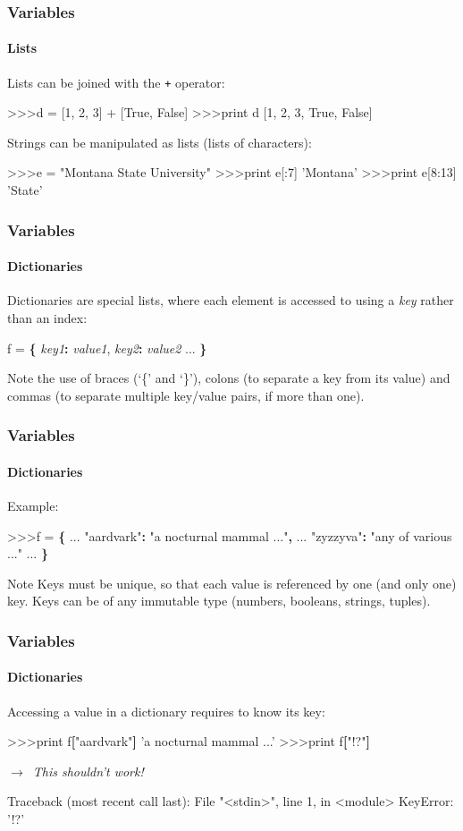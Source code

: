 \documentclass[handout]{beamer}
\def\prompt{>\hspace{-1pt}>\hspace{-1pt}>\/}
\newcommand{\comment}[1]{{\raggedright $\rightarrow$~\textit{\textsf{#1}}}}
\begin{document}
\begin{frame}[fragile]
	\frametitle{Variables}
	\framesubtitle{Lists}

	Lists can be joined with the \texttt{+} operator:
	\begin{semiverbatim}
		\prompt d = [1, 2, 3] + [True, False]
		\prompt print d
		[1, 2, 3, True, False]
	\end{semiverbatim}

	\pause
	Strings can be manipulated as lists (lists of characters):
	\begin{semiverbatim}
		\prompt e = "Montana State University"
		\prompt print e[:7]
		'Montana'
		\prompt print e[8:13]
		'State'
	\end{semiverbatim}
\end{frame}

\begin{frame}[fragile]
	\frametitle{Variables}
	\framesubtitle{Dictionaries}

	Dictionaries are special lists, where each element is accessed to using a  \textit{key} rather than an index:

	\begin{semiverbatim}
		f = \textbf{\{} \textit{key1}\textbf{:} \textit{value1}, \textit{key2}\textbf{:} \textit{value2} ... \textbf{\}}
	\end{semiverbatim}

	Note the use of braces (`\{' and `\}'), colons (to separate a key from its value) and commas (to separate multiple key/value pairs, if more than one).
\end{frame}

\begin{frame}[fragile]
	\frametitle{Variables}
	\framesubtitle{Dictionaries}

	Example:

	\begin{semiverbatim}
		\prompt f = \textbf{\{}
		...       "aardvark"\textbf{:} "a nocturnal mammal ..."\textbf{,}
		...       "zyzzyva"\textbf{:} "any of various ..."
		...      \textbf{\}}
	\end{semiverbatim}

	\begin{block}{Note}
		Keys must be unique, so that each value is referenced by one (and only one) key. Keys can be of any immutable type (numbers, booleans, strings, tuples).
	\end{block}
\end{frame}

\begin{frame}[fragile]
	\frametitle{Variables}
	\framesubtitle{Dictionaries}

	Accessing a value in a dictionary requires to know its key:
	\begin{semiverbatim}
		\prompt print f\textbf{[}"aardvark"\textbf{]}
		'a nocturnal mammal ...'
		\pause
		\prompt print f\textbf{[}"!?"\textbf{]}	\comment{This shouldn't work!}
		Traceback (most recent call last):
		  File "<stdin>", line 1, in <module>
		KeyError: '!?'
	\end{semiverbatim}
\end{frame}
\end{document}
